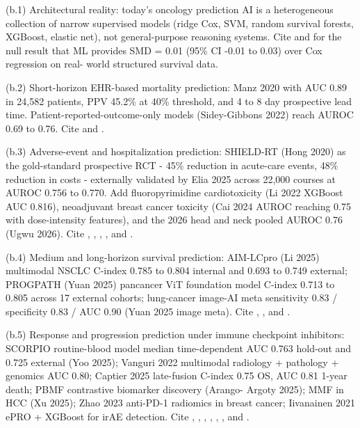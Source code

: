 (b.1) Architectural reality: today's oncology prediction AI is a
heterogeneous collection of narrow supervised models (ridge Cox, SVM,
random survival forests, XGBoost, elastic net), not general-purpose
reasoning systems. Cite \cite{Smiley2025OncologyMLReportingQuality} and
\cite{Huang2025CancerSurvivalMetaAnalysis} for the null result that ML
provides SMD = 0.01 (95\% CI -0.01 to 0.03) over Cox regression on real-
world structured survival data.

(b.2) Short-horizon EHR-based mortality prediction: Manz 2020 with AUC
0.89 in 24,582 patients, PPV 45.2\% at 40\% threshold, and 4 to 8 day
prospective lead time. Patient-reported-outcome-only models (Sidey-Gibbons
2022) reach AUROC 0.69 to 0.76. Cite \cite{Manz2020Oncology180DayMortality}
and \cite{SideyGibbons2022OvarianPROMortality}.

(b.3) Adverse-event and hospitalization prediction: SHIELD-RT (Hong 2020)
as the gold-standard prospective RCT - 45\% reduction in acute-care events,
48\% reduction in costs - externally validated by Elia 2025 across 22,000
courses at AUROC 0.756 to 0.770. Add fluoropyrimidine cardiotoxicity (Li
2022 XGBoost AUC 0.816), neoadjuvant breast cancer toxicity (Cai 2024
AUROC reaching 0.75 with dose-intensity features), and the 2026 head and
neck pooled AUROC 0.76 (Ugwu 2026). Cite \cite{Hong2020SHIELDRT},
\cite{Elia2025SHIELDRTExternalValidation},
\cite{Li2022FluoropyrimidineCardiotoxicity},
\cite{Cai2024BreastCancerToxicityPrediction}, and
\cite{Ugwu2026HeadNeckRadiationToxicityMeta}.

(b.4) Medium and long-horizon survival prediction: AIM-LCpro (Li 2025)
multimodal NSCLC C-index 0.785 to 0.804 internal and 0.693 to 0.749
external; PROGPATH (Yuan 2025) pancancer ViT foundation model C-index
0.713 to 0.805 across 17 external cohorts; lung-cancer image-AI meta
sensitivity 0.83 / specificity 0.83 / AUC 0.90 (Yuan 2025 image meta).
Cite \cite{Li2025AIMLCpro}, \cite{Yuan2025PROGPATH}, and
\cite{Yuan2025LungImageMeta}.

(b.5) Response and progression prediction under immune checkpoint
inhibitors: SCORPIO routine-blood model median time-dependent AUC 0.763
hold-out and 0.725 external (Yoo 2025); Vanguri 2022 multimodal radiology
+ pathology + genomics AUC 0.80; Captier 2025 late-fusion C-index 0.75
OS, AUC 0.81 1-year death; PBMF contrastive biomarker discovery (Arango-
Argoty 2025); MMF in HCC (Xu 2025); Zhao 2023 anti-PD-1 radiomics in
breast cancer; Iivanainen 2021 ePRO + XGBoost for irAE detection. Cite
\cite{Yoo2025SCORPIO}, \cite{Vanguri2022MultimodalPDL1NSCLC},
\cite{Captier2025MultimodalNSCLCImmunotherapy}, \cite{ArangoArgoty2025PBMF},
\cite{Xu2025MMF}, \cite{Zhao2023BreastRadiomics}, and \cite{Iivanainen2021irAE}.

